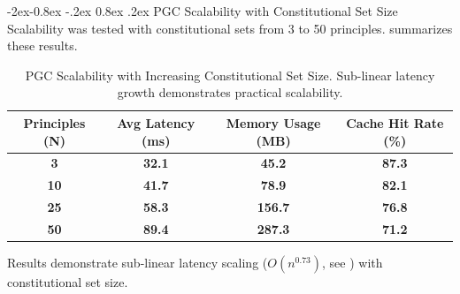 \documentclass[manuscript,screen,9pt]{acmart}
\makeatletter
\renewcommand\subsubsection{\@startsection{subsubsection}{3}{\z@}%
  {-2ex\@plus -0.8ex \@minus -.2ex}%
  {0.8ex \@plus .2ex}%
  {\normalfont\normalsize\bfseries}}
\newcommand{\tablesize}{\footnotesize}
\newcommand{\tablenumfmt}[1]{\textbf{#1}}
\newcommand{\tableheader}[1]{\textbf{#1}}
\makeatother
\begin{document}
\subsubsection{PGC Scalability with Constitutional Set Size}
Scalability was tested with constitutional sets from 3 to 50 principles.  summarizes these results.
\begin{table}[htbp]
\centering
\caption{PGC Scalability with Increasing Constitutional Set Size. Sub-linear latency growth demonstrates practical scalability.}
\label{tab:pgc_scalability}
\tablesize
\begin{tabular}{@{}cccc@{}}
\toprule
\tableheader{Principles (N)} & \tableheader{Avg Latency (ms)} & \tableheader{Memory Usage (MB)} & \tableheader{Cache Hit Rate (\%)} \\
\midrule
\tablenumfmt{3}   & \tablenumfmt{32.1}  & \tablenumfmt{45.2}  & \tablenumfmt{87.3} \\
\tablenumfmt{10}  & \tablenumfmt{41.7}  & \tablenumfmt{78.9}  & \tablenumfmt{82.1} \\
\tablenumfmt{25}  & \tablenumfmt{58.3}  & \tablenumfmt{156.7} & \tablenumfmt{76.8} \\
\tablenumfmt{50}  & \tablenumfmt{89.4}  & \tablenumfmt{287.3} & \tablenumfmt{71.2} \\
\bottomrule
\end{tabular}
\end{table}
Results demonstrate sub-linear latency scaling ($O(n^{0.73})$, see ) with constitutional set size.
\end{document}

